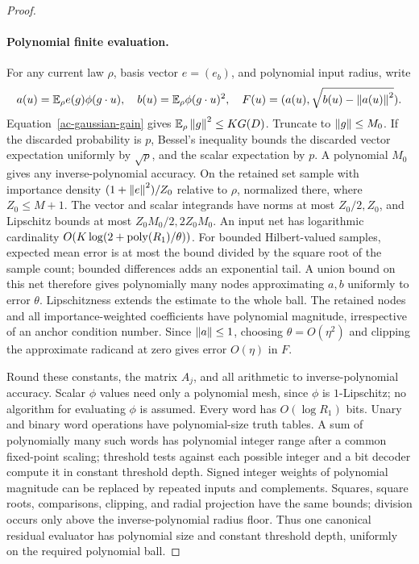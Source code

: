 \begin{proof}
\paragraph{Polynomial finite evaluation.}
For any current law $\rho$, basis vector $e=(e_b)$, and polynomial
input radius, write
\[
 a(u)=\mathbb E_\rho e(g)\phi(g\cdot u),\quad
 b(u)=\mathbb E_\rho\phi(g\cdot u)^2,\quad
 F(u)=(a(u),\sqrt{b(u)-\left\lVert a(u)\right\rVert^2}).
\]
Equation~\eqref{ac-gaussian-gain} gives
$\mathbb E_\rho\left\lVert g\right\rVert^2\le K G(D)$. Truncate to $\left\lVert g\right\rVert\le M_0$.
If the discarded probability is $p$, Bessel's inequality bounds the
discarded vector expectation uniformly by $\sqrt p$, and the scalar
expectation by $p$. A polynomial $M_0$ gives any inverse-polynomial
accuracy. On the retained set sample with importance density
$(1+\left\lVert e\right\rVert^2)/Z_0$ relative to $\rho$, normalized there, where
$Z_0\le M+1$. The vector and scalar integrands have norms at most
$Z_0/2,Z_0$, and Lipschitz bounds at most $Z_0M_0/2,2Z_0M_0$.
An input net has logarithmic cardinality
$O(K\log(2+\operatorname{poly}(R_1)/\theta))$. For bounded Hilbert-valued
samples, expected mean error is at most the bound divided by the
square root of the sample count; bounded differences adds an
exponential tail. A union bound on this net therefore gives
polynomially many nodes approximating $a,b$ uniformly to error
$\theta$. Lipschitzness extends the estimate to the whole ball.
The retained nodes and all importance-weighted coefficients have
polynomial magnitude, irrespective of an anchor condition number.
Since $\left\lVert a\right\rVert\le1$, choosing $\theta=O(\eta^2)$ and clipping
the approximate radicand at zero gives error $O(\eta)$ in $F$.

Round these constants, the matrix $A_j$, and all arithmetic to
inverse-polynomial accuracy. Scalar $\phi$ values need only a
polynomial mesh, since $\phi$ is $1$-Lipschitz; no algorithm for
evaluating $\phi$ is assumed. Every word has $O(\log R_1)$ bits.
Unary and binary word operations have polynomial-size truth tables.
A sum of polynomially many such words has polynomial integer range
after a common fixed-point scaling; threshold tests against each
possible integer and a bit decoder compute it in constant threshold
depth. Signed integer weights of polynomial magnitude can be
replaced by repeated inputs and complements. Squares, square roots,
comparisons, clipping, and radial projection have the same bounds;
division occurs only above the inverse-polynomial radius floor.
Thus one canonical residual evaluator has polynomial size and
constant threshold depth, uniformly on the required polynomial ball.


\end{proof}
